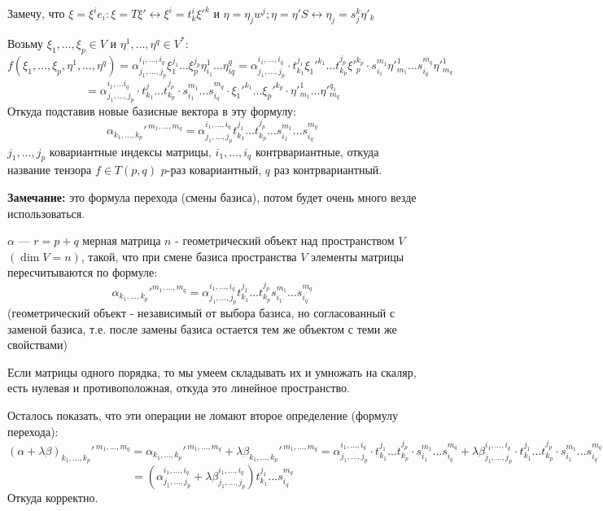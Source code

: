 Замечу, что $\xi =\xi^i e_i: \xi = T \xi' \leftrightarrow \xi^i = t_k^i\xi'^k$
и $\eta = \eta_j w^j; \eta = \eta'S \leftrightarrow \eta_j = s_{j}^k \eta'_k $

Возьму $\xi_1,\ldots,\xi_p \in V$ и $\eta^1,\ldots, \eta^q\in V^*$:
$$f(\xi_1,\ldots,\xi_p,\eta^1,\ldots,\eta^q)=\alpha^{i_1,\ldots,i_q}_{j_1,\ldots, j_p}\xi_1^{j_1}\ldots \xi_{p}^{j_p} \eta_{i_1}^1 \ldots \eta_{iq}^q =\alpha^{i_1,\ldots,i_q}_{j_1,\ldots, j_p} \cdot t_{k_1}^{j_1}\xi_1'^{k_1}\ldots t_{k_p}^{{j_p}}\xi'^{k_p}_p \cdot s_{i_1}^{m_1}\eta'^1_{m_1}\ldots s_{i_q}^{m_q}\eta'^1_{m_q}$$
$$= \alpha^{i_1,\ldots i_q}_{j_1,\ldots, j_p} \cdot t_{k_1}^{j}\ldots t_{k_p}^{j_p}\cdot s_{i_1}^{m_1}\ldots s_{i_q}^{m_q}\cdot \xi_1'^{k_1}\ldots \xi_{p}'^{k_p} \cdot \eta'^{1}_{m_1}\ldots \eta'^{q_1}_{m_q}$$
Откуда подставив новые базисные вектора в эту формулу:
$$\alpha_{k_1,\ldots,k_p}'^{\,m_1,\ldots, m_q} = \alpha_{j_1,\ldots,j_p}^{i_1,\ldots, i_q}t_{k_1}^{j_1}\ldots t_{k_p}^{j_p}\ldots s_{i_1}^{m_1}\ldots s_{i_q}^{m_q}$$
$j_1,\ldots, j_p$ ковариантные индексы матрицы, $i_1,\ldots, i_q$ контрвариантные, откуда название тензора $f\in T(p,q)$ $p$-раз ковариантный, $q$ раз контрвариантный.

\textbf{Замечание:} это формула перехода (смены базиса), потом будет очень много везде использоваться.


 $\alpha$ --- $r = p+q$ мерная матрица $n$ - геометрический объект над пространством $V$ $(\dim V =n)$, такой, что при смене базиса пространства $V$ элементы матрицы пересчитываются по формуле:
$$\alpha_{k_1,\ldots,k_p}'^{m_1,\ldots, m_q} = \alpha_{j_1,\ldots,j_p}^{i_1,\ldots, i_q}t_{k_1}^{j_1}\ldots t_{k_p}^{j_p} s_{i_1}^{m_1}\ldots s_{i_q}^{m_q}$$(геометрический объект - независимый от выбора базиса, но согласованный с заменой базиса, т.е. после замены базиса остается тем же объектом с теми же свойствами)

Если матрицы одного порядка, то мы умеем складывать их и умножать на скаляр, есть нулевая и противоположная, откуда это линейное пространство.  

Осталось показать, что эти операции не ломают второе определение (формулу перехода):
$$(\alpha + \lambda \beta)_{k_1,\ldots,k_p}'^{\,m_1,\ldots,m_q} = \alpha_{k_1,\ldots,k_p}'^{\, m_1,\ldots, m_q} + \lambda \beta_{k_1,\ldots,k_p}'^{\, m_1,\ldots, m_q} = \alpha_{j_1,\ldots,j_p}^{i_1,\ldots,i_q} \cdot t_{k_1}^{j_1} \ldots t_{k_p}^{j_p}\cdot s_{i_1}^{m_1}\ldots s_{i_q}^{m_q} + \lambda\beta_{j_1,\ldots,j_p}^{i_1,\ldots,i_q} \cdot t_{k_1}^{j_1} \ldots t_{k_p}^{j_p}\cdot s_{i_1}^{m_1}\ldots s_{i_q}^{m_q} $$
$$= (\alpha_{j_1,\ldots, j_p}^{i_1,\ldots,i_q} + \lambda \beta_{j_1,\ldots, j_p}^{i_1,\ldots,i_q})t_{k_1}^{j_1}\ldots s_{i_q}^{m_q}$$
Откуда корректно.

